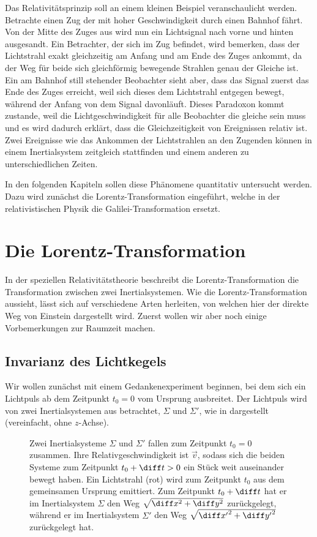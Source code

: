 Das Relativitätsprinzip soll an einem kleinen Beispiel veranschaulicht werden. Betrachte einen Zug der mit hoher Geschwindigkeit durch einen Bahnhof fährt.
Von der Mitte des Zuges aus wird nun ein Lichtsignal nach vorne und hinten ausgesandt. Ein Betrachter, der sich im Zug befindet, wird bemerken, dass der Lichtstrahl exakt gleichzeitig am Anfang und am Ende des Zuges ankommt, da der Weg für beide sich gleichförmig bewegende Strahlen genau der Gleiche ist.
Ein am Bahnhof still stehender Beobachter sieht aber, dass das Signal zuerst das Ende des Zuges erreicht, weil sich dieses dem Lichtstrahl entgegen bewegt, während der Anfang von dem Signal davonläuft.
Dieses Paradoxon kommt zustande, weil die Lichtgeschwindigkeit für alle Beobachter die gleiche sein muss und es wird dadurch erklärt, dass die Gleichzeitigkeit von Ereignissen relativ ist.
Zwei Ereignisse wie das Ankommen der Lichtstrahlen an den Zugenden können in einem Inertialsystem zeitgleich stattfinden und einem anderen zu unterschiedlichen Zeiten.

In den folgenden Kapiteln sollen diese Phänomene quantitativ untersucht werden.
Dazu wird zunächst die Lorentz-Transformation eingeführt, welche in der relativistischen Physik die Galilei-Transformation ersetzt.


\section{Die Lorentz-Transformation}

In der speziellen Relativitätstheorie beschreibt die Lorentz-Transformation die Transformation zwischen zwei Inertialsystemen.
Wie die Lorentz-Transformation aussieht, lässt sich auf verschiedene Arten herleiten, von welchen hier der direkte Weg von Einstein dargestellt wird.
Zuerst wollen wir aber noch einige Vorbemerkungen zur Raumzeit machen.


\subsection{Invarianz des Lichtkegels}

Wir wollen zunächst mit einem Gedankenexperiment beginnen, bei dem sich ein Lichtpuls ab dem Zeitpunkt $t_0=0$ vom Ursprung ausbreitet.
Der Lichtpuls wird von zwei Inertialsystemen aus betrachtet, $\Sigma$ und $\Sigma'$, wie in  dargestellt (vereinfacht, ohne $z$-Achse).

\begin{figure}[htb]
    \centering
    \tfigTwoInertialSystemsMovingAway
    \caption{Zwei Inertialsysteme $\Sigma$ und $\Sigma'$ fallen zum Zeitpunkt $t_0=0$ zusammen. Ihre Relativgeschwindigkeit ist $\vec v$, sodass sich die beiden Systeme zum Zeitpunkt $t_0+\diff t>0$ ein Stück weit auseinander bewegt haben.
    Ein Lichtstrahl (rot) wird zum Zeitpunkt $t_0$ aus dem gemeinsamen Ursprung emittiert.
    Zum Zeitpunkt $t_0+\diff t$ hat er im Inertialsystem $\Sigma$ den Weg $\sqrt{\diff x^2+\diff y^2}$ zurückgelegt, während er im Inertialsystem $\Sigma'$ den Weg $\sqrt{{\diff x'}^2+{\diff y'}^2}$ zurückgelegt hat. }
    \label{fig:srt_gedankenexperiment_lichtkegel}
\end{figure}

